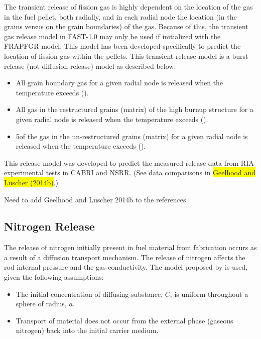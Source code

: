 The transient release of fission gas is highly dependent on the location of the gas in the fuel
pellet, both radially, and in each radial node the location (in the grains versus on the grain
boundaries) of the gas.  Because of this, the transient gas release model in FAST-1.0 may only be
used if initialized with the {FRAPFGR} model.  This model has been developed specifically to predict
the location of fission gas within the pellets. This transient release model is a burst release (not
diffusion release) model as described below:

\begin{itemize}

    \item All grain boundary gas for a given radial node is released when the temperature exceeds
         ().

    \item All gas in the restructured grains (matrix) of the high burnup structure for a given radial
        node is released when the temperature exceeds  ().

    \item 5\percent of the gas in the un-restructured grains (matrix) for a given radial node is
        released when the temperature exceeds  ().

\end{itemize}

This release model was developed to predict the measured release data from RIA experimental tests in
CABRI and NSRR. (See data comparisons in \colorbox{yellow}{Geelhood and Luscher (2014b)}.)

{\color{red}Need to add Geelhood and Luscher 2014b to the references}

\subsection{Nitrogen Release} \label{section:nitrogen-release}

The release of nitrogen initially present in fuel material from fabrication occurs as a result of a
diffusion transport mechanism.  The release of nitrogen affects the rod internal pressure and the
gas conductivity. The model proposed by \cite{Booth1957} is used, given the following
assumptions:

\begin{itemize}

    \item The initial concentration of diffusing substance, $C$, is uniform throughout a sphere of
        radius, $a$.
    \item Transport of material does not occur from the external phase (gaseous nitrogen) back into
        the initial carrier medium.

\end{itemize}

